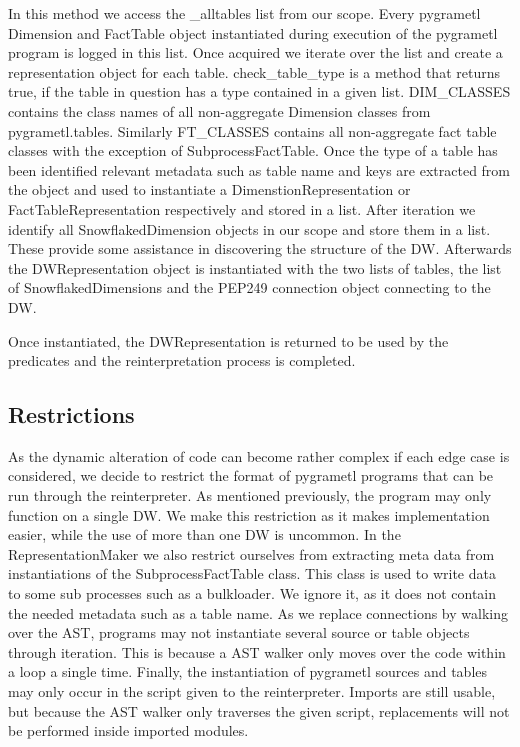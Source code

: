 In this method we access the \_alltables list from our scope. Every pygrametl Dimension and FactTable object instantiated during execution of the pygrametl program is logged in this list. Once acquired we iterate over the list and create a representation object for each table. check\_table\_type is a method that returns true, if the table in question has a type contained in a given list. DIM\_CLASSES contains the class names of all non-aggregate Dimension classes from pygrametl.tables. Similarly FT\_CLASSES contains all non-aggregate fact table classes with the exception of SubprocessFactTable. Once the type of a table has been identified relevant metadata such as table name and keys are extracted from the object and used to instantiate a DimenstionRepresentation or FactTableRepresentation respectively and stored in a list. After iteration we identify all SnowflakedDimension objects in our scope and store them in a list. These provide some assistance in discovering the structure of the DW. Afterwards the DWRepresentation object is instantiated with the two lists of tables, the list of SnowflakedDimensions and the PEP249 connection object connecting to the DW.

Once instantiated, the DWRepresentation is returned to be used by the predicates and the reinterpretation process is completed.

\subsection{Restrictions}
As the dynamic alteration of code can become rather complex if each edge case is considered, we decide to restrict the format of pygrametl programs that can be run through the reinterpreter. As mentioned previously, the program may only function on a single DW. We make this restriction as it makes implementation easier, while the use of more than one DW is uncommon. In the RepresentationMaker we also restrict ourselves from extracting meta data from instantiations of the SubprocessFactTable class. This class is used to write data to some sub processes such as a bulkloader. We ignore it, as it does not contain the needed metadata such as a table name. As we replace connections by walking over the AST, programs may not instantiate several source or table objects through iteration. This is because a AST walker only moves over the code within a loop a single time. Finally, the instantiation of pygrametl sources and tables may only occur in the script given to the reinterpreter. Imports are still usable, but because the AST walker only traverses the given script, replacements will not be performed inside imported modules.   

